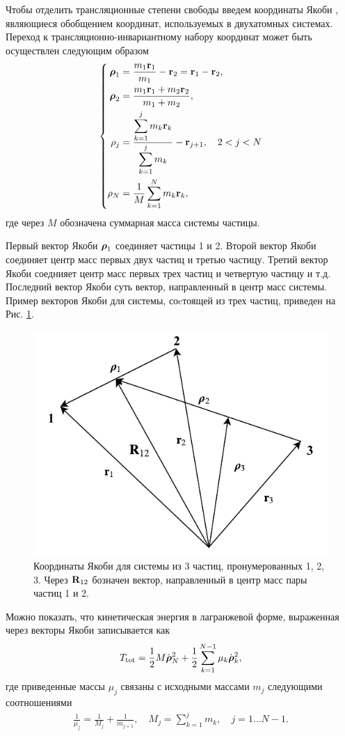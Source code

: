 Чтобы отделить трансляционные степени свободы введем координаты Якоби \cite{greiner, littlejohn1995}, являющиеся обобщением координат, используемых в двухатомных системах. Переход к трансляционно-инвариантному набору координат может быть осуществлен следующим образом \cite{greiner}
\begin{gather}  
    \left\{
    \begin{aligned}
        \boldsymbol{\rho}_1 &= \frac{m_1 \mathbf{r}_1}{m_1} - \mathbf{r}_2 = \mathbf{r}_1 - \mathbf{r}_2, \\
        \boldsymbol{\rho}_2 &= \frac{m_1 \mathbf{r}_1 + m_2 \mathbf{r}_2}{m_1 + m_2}, \\
        \mathbf{\rho}_j &= \frac{\displaystyle \sum_{k = 1}^j m_k \mathbf{r}_k}{\displaystyle \sum_{k = 1}^j m_k} - \mathbf{r}_{j + 1}, \quad 2 < j < N \\
        \mathbf{\rho}_N &= \frac{1}{M} \sum_{k = 1}^N m_k \mathbf{r}_k,
    \end{aligned}
    \right.
\end{gather}
%
где через $M$ обозначена суммарная масса системы частицы. \par
Первый вектор Якоби $\boldsymbol{\rho}_1$ соединяет частицы 1 и 2. Второй вектор Якоби соединяет центр масс первых двух частиц и третью частицу. Третий вектор Якоби соеднияет центр масс первых трех частиц и четвертую частицу и т.д. Последний вектор Якоби суть вектор, направленный в центр масс системы. Пример векторов Якоби для системы, соcтоящей из трех частиц, приведен на Рис. \ref{fig:jacobi_coordinates}. 

\begin{figure}
    \centering
    \includegraphics[width=0.5\linewidth]{pictures/jacobi_coordinates.pdf}
    \caption{Координаты Якоби  для системы из 3 частиц, пронумерованных 1, 2, 3. Через $\mathbf{R}_{12}$ бозначен вектор, направленный в центр масс пары частиц 1 и 2.}
    \label{fig:jacobi_coordinates}
\end{figure}

Можно показать, что кинетическая энергия в лагранжевой форме, выраженная через векторы Якоби записывается как \cite{greiner} 
\begin{gather}
    T_\text{tot} = \frac{1}{2} M \dot{\boldsymbol{\rho}}_N^2 + \frac{1}{2} \sum_{k = 1}^{N - 1} \mu_k \dot{\boldsymbol{\rho}}_k^2,
\end{gather}
%
где приведенные массы $\mu_j$ связаны с исходными массами $m_j$ следующими соотношениями
\begin{gather}
    \frac{1}{\mu_j} = \frac{1}{M_j} + \frac{1}{m_{j+1}}, \quad M_j = \sum_{k = 1}^j m_k, \quad j = 1 \dots N - 1. \label{polyatom-jacobi-masses}
\end{gather}

